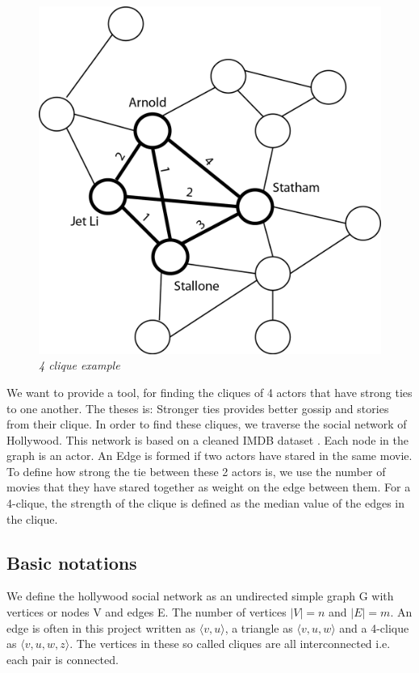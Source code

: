 \documentclass{article}
\begin{document}
\begin{figure}[H]
\begin{center}
\includegraphics[scale=0.45]{graph_4clique.png}
\end{center}
\caption{\small {\it {4 clique example}}} 
\label{fig: 4clique example}
\end{figure}

We want to provide a tool, for finding the cliques of 4 actors that have strong ties to one another. The theses is: Stronger ties provides better gossip and stories from their clique. In order to find these cliques, we traverse the social network of Hollywood. This network is based on a cleaned IMDB dataset \cite{imdb}.
Each node in the graph is an actor. An Edge is formed if two actors have stared in the same movie. To define how strong the tie between these 2 actors is, we use the number of movies that they have stared together as weight on the edge between them. For a 4-clique, the strength of the clique is defined as the median value of the edges in the clique.

\subsection{Basic notations}
We define the hollywood social network as an undirected simple graph G with vertices or nodes V and edges E. The number of vertices $|V| = n$ and $|E| = m$. An edge is often in this project written as $\langle v,u\rangle$, a triangle as $\langle v,u,w\rangle$ and a 4-clique as $\langle v,u,w,z\rangle$. The vertices in these so called cliques are all interconnected i.e. each pair is connected.
\end{document}
